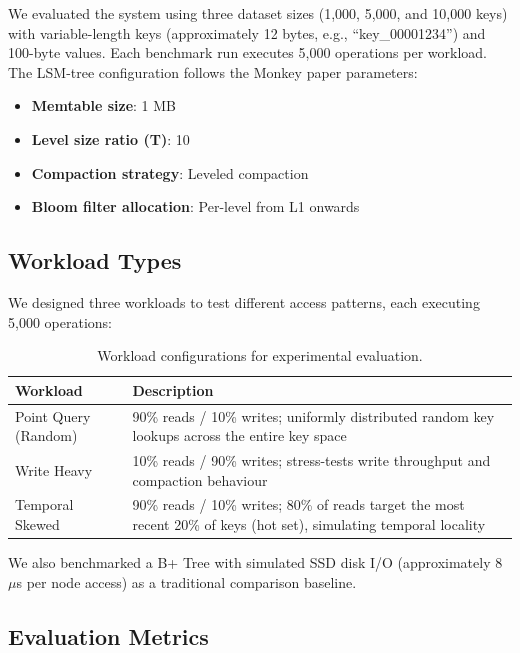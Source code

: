 \documentclass{mnitjaipur}
\begin{document}
We evaluated the system using three dataset sizes (1,000, 5,000, and 10,000 keys) with variable-length keys (approximately 12 bytes, e.g., ``key\_00001234'') and 100-byte values. Each benchmark run executes 5,000 operations per workload. The LSM-tree configuration follows the Monkey paper parameters:

\begin{itemize}
    \item \textbf{Memtable size}: 1 MB
    \item \textbf{Level size ratio (T)}: 10
    \item \textbf{Compaction strategy}: Leveled compaction
    \item \textbf{Bloom filter allocation}: Per-level from L1 onwards
\end{itemize}

\subsection{Workload Types}

We designed three workloads to test different access patterns, each executing 5,000 operations:

\begin{table}[h]
    \centering
    \begin{tabular}{p{3.5cm}p{9.5cm}}
        \toprule
        \textbf{Workload} & \textbf{Description} \\
        \midrule
        Point Query (Random) & 90\% reads / 10\% writes; uniformly distributed random key lookups across the entire key space \\
        Write Heavy & 10\% reads / 90\% writes; stress-tests write throughput and compaction behaviour \\
        Temporal Skewed & 90\% reads / 10\% writes; 80\% of reads target the most recent 20\% of keys (hot set), simulating temporal locality \\
        \bottomrule
    \end{tabular}
    \caption{Workload configurations for experimental evaluation.}
    \label{tab:workloads}
\end{table}

We also benchmarked a B+ Tree with simulated SSD disk I/O (approximately 8~$\mu$s per node access) as a traditional comparison baseline.

\subsection{Evaluation Metrics}
\end{document}
